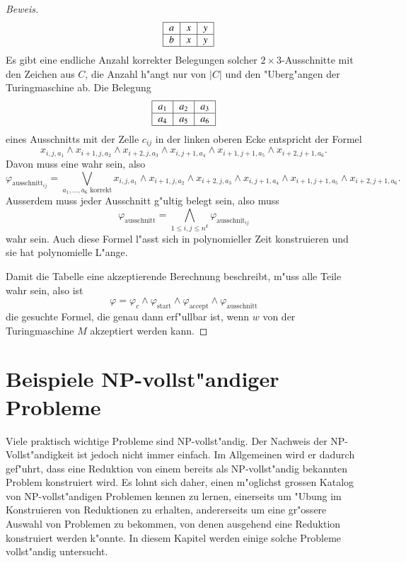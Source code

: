 \begin{proof}[Beweis]
\[\begin{tabular}{|c|c|c|}
\hline
\end{tabular}
\quad
\begin{tabular}{|c|c|c|}
\hline
$a$&$x$&$y$\\
\hline
$b$&$x$&$y$\\
\hline
\end{tabular}
\]
Es gibt eine endliche Anzahl korrekter Belegungen solcher
$2\times 3$-Ausschnitte mit den Zeichen aus $C$, die Anzahl
h"angt nur von $|C|$ und den "Uberg"angen der Turingmaschine ab.
Die Belegung
\[
\begin{tabular}{|c|c|c|}
\hline
$a_1$&$a_2$&$a_3$\\
\hline
$a_4$&$a_5$&$a_6$\\
\hline
\end{tabular}
\]
eines Ausschnitts mit der Zelle $c_{ij}$ in der
linken oberen Ecke entspricht der Formel
\[
x_{i,j,a_1}\wedge
x_{i+1,j,a_2}\wedge
x_{i+2,j,a_3}\wedge
x_{i,j+1,a_4}\wedge
x_{i+1,j+1,a_5}\wedge
x_{i+2,j+1,a_6}.
\]
Davon muss eine wahr sein, also
\[
\varphi_{\text{ausschnitt}_{ij}}
=
\bigvee_{\text{$a_1,\dots,a_6$ korrekt}}
x_{i,j,a_1}\wedge
x_{i+1,j,a_2}\wedge
x_{i+2,j,a_3}\wedge
x_{i,j+1,a_4}\wedge
x_{i+1,j+1,a_5}\wedge
x_{i+2,j+1,a_6}.
\]
Ausserdem muss jeder Ausschnitt g"ultig belegt sein, also
muss
\[
\varphi_{\text{ausschnitt}} =\bigwedge_{1\le i,j\le n^k}\varphi_{\text{ausschnit}_{ij}}
\]
wahr sein. Auch diese Formel l"asst sich in polynomieller Zeit konstruieren
und sie hat polynomielle L"ange.

Damit die Tabelle eine akzeptierende Berechnung beschreibt, m"uss
alle Teile wahr sein, also ist
\[
\varphi =
\varphi_{c}\wedge
\varphi_{\text{start}}\wedge
\varphi_{\text{accept}}\wedge
\varphi_{\text{ausschnitt}}
\]
die gesuchte Formel, die genau dann erf"ullbar ist, wenn $w$ von der
Turingmaschine $M$ akzeptiert werden kann.
\end{proof}

\section{Beispiele NP-vollst"andiger Probleme}
Viele praktisch wichtige Probleme sind NP-vollst"andig. Der Nachweis
der NP-Vollst"andigkeit ist jedoch nicht immer einfach. Im Allgemeinen
wird er dadurch gef"uhrt, dass eine Reduktion von einem bereits als
NP-vollst"andig bekannten Problem konstruiert wird. Es lohnt sich
daher, einen m"oglichst grossen Katalog von NP-vollst"andigen
Problemen kennen zu lernen, einerseits um "Ubung im Konstruieren
von Reduktionen zu erhalten, andererseits um eine gr"ossere Auswahl 
von Problemen zu bekommen, von denen ausgehend eine Reduktion 
konstruiert werden k"onnte. In diesem Kapitel werden einige
solche Probleme vollst"andig untersucht.
